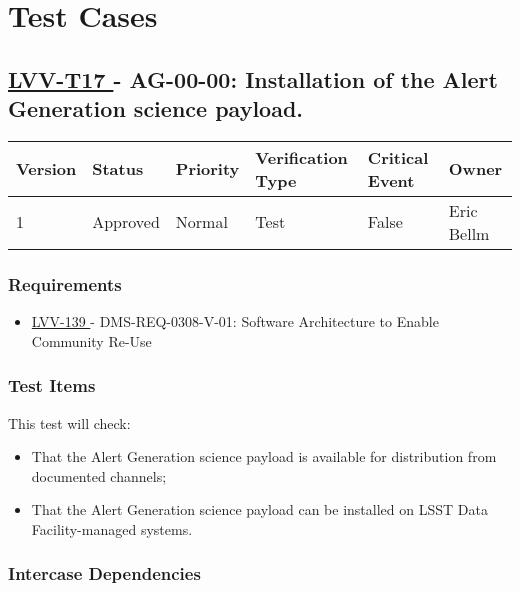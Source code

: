 \section{Test Cases}


\subsection{ \href{https://jira.lsstcorp.org/secure/Tests.jspa\#/testCase/LVV-T17}{ LVV-T17 }
             - AG-00-00: Installation of the Alert Generation science payload. }\label{lvv-t17}





\begin{longtable}[]{llllll}
\toprule
Version & Status & Priority & Verification Type & Critical Event & Owner
\\\midrule
1 & Approved & Normal & Test & False & Eric Bellm
\\\bottomrule
\end{longtable}

\subsubsection{Requirements}

\begin{itemize}

\item \href{https://jira.lsstcorp.org/browse/LVV-139}{ LVV-139 } - DMS-REQ-0308-V-01: Software Architecture to Enable Community Re-Use

\end{itemize}


\subsubsection{Test Items}

This test will check:

\begin{itemize}
\tightlist
\item
  That the Alert Generation science payload is available for
  distribution from documented channels;
\item
  That the Alert Generation science payload can be installed on LSST
  Data Facility-managed systems.
\end{itemize}





\subsubsection{Intercase Dependencies}

